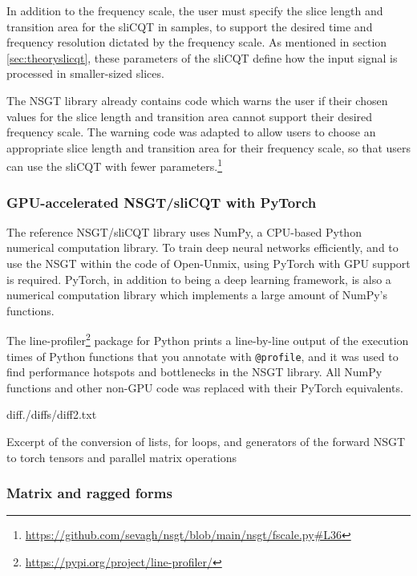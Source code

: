 \documentclass[report.tex]{subfiles}
\begin{document}
In addition to the frequency scale, the user must specify the slice length and transition area for the sliCQT in samples, to support the desired time and frequency resolution dictated by the frequency scale. As mentioned in section \ref{sec:theoryslicqt}, these parameters of the sliCQT define how the input signal is processed in smaller-sized slices.

The NSGT library already contains code which warns the user if their chosen values for the slice length and transition area cannot support their desired frequency scale. The warning code was adapted to allow users to choose an appropriate slice length and transition area for their frequency scale, so that users can use the sliCQT with fewer parameters.\footnote{\url{https://github.com/sevagh/nsgt/blob/main/nsgt/fscale.py\#L36}}

\subsubsection{GPU-accelerated NSGT/sliCQT with PyTorch}
\label{sec:torchslicq}

The reference NSGT/sliCQT library uses NumPy, a CPU-based Python numerical computation library. To train deep neural networks efficiently, and to use the NSGT within the code of Open-Unmix, using PyTorch with GPU support is required. PyTorch, in addition to being a deep learning framework, is also a numerical computation library which implements a large amount of NumPy's functions.

The line-profiler\footnote{\url{https://pypi.org/project/line-profiler/}} package for Python prints a line-by-line output of the execution times of Python functions that you annotate with \Verb#@profile#, and it was used to find performance hotspots and bottlenecks in the NSGT library. All NumPy functions and other non-GPU code was replaced with their PyTorch equivalents.

\begin{listing}[ht]
  \centering
\begin{inputminted}[linenos,breaklines,frame=single,fontsize=\scriptsize]{diff}{./diffs/diff2.txt}
\end{inputminted}
  \caption{Excerpt of the conversion of lists, for loops, and generators of the forward NSGT to torch tensors and parallel matrix operations}
  \label{code:seconddiff}
\end{listing}

\subsubsection{Matrix and ragged forms}
\label{sec:matrixvragged}
\end{document}
